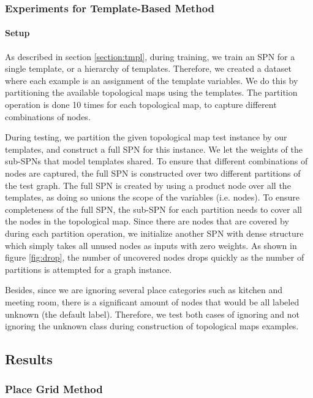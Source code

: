 \documentclass[10pt, titlepage]{article}
\theoremstyle{definition}
\begin{document}
\subsubsection{Experiments for Template-Based Method}\label{section:exp-tmpl}

\paragraph{Setup} As described in section \ref{section:tmpl}, during training, we train an SPN for a single template, or a hierarchy of templates. Therefore, we created a dataset where each example is an assignment of the template variables. We do this by partitioning the available topological maps using the templates. The partition operation is done 10 times for each topological map, to capture different combinations of nodes.

During testing, we partition the given topological map test instance by our templates, and construct a full SPN for this instance. We let the weights of the sub-SPNs that model templates shared.  To ensure that different combinations of nodes are captured, the full SPN is constructed over two different partitions of the test graph. The full SPN is created by using a product node over all the templates, as doing so unions the scope of the variables (i.e. nodes). To ensure completeness of the full SPN, the sub-SPN for each partition needs to cover all the nodes in the topological map. Since there are nodes that are covered by during each partition operation, we initialize another SPN with dense structure which simply takes all unused nodes as inputs with zero weights. As shown in figure \ref{fig:drop}, the number of uncovered nodes drops quickly as the number of partitions is attempted for a graph instance.

Besides, since we are ignoring several place categories such as kitchen and meeting room, there is a significant amount of nodes that would be all labeled unknown (the default label). Therefore, we test both cases of ignoring and not ignoring the unknown class during construction of topological maps examples.

\subsection{Results}\label{section:results}

\subsubsection{Place Grid Method}
\end{document}
